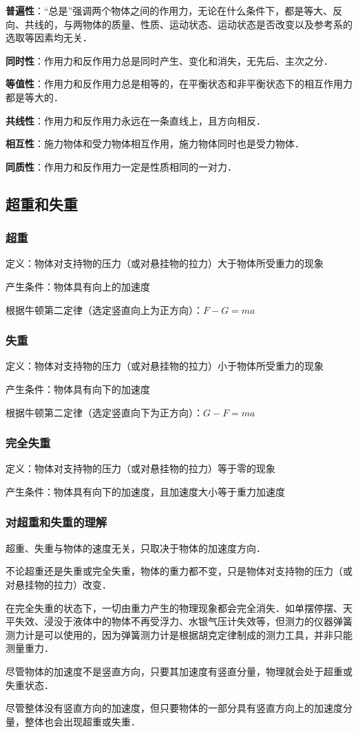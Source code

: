 \textbf{普遍性}：“总是”强调两个物体之间的作用力，无论在什么条件下，都是等大、反向、共线的，与两物体的质量、性质、运动状态、运动状态是否改变以及参考系的选取等因素均无关．

\textbf{同时性}：作用力和反作用力总是同时产生、变化和消失，无先后、主次之分．

\textbf{等值性}：作用力和反作用力总是相等的，在平衡状态和非平衡状态下的相互作用力都是等大的．

\textbf{共线性}：作用力和反作用力永远在一条直线上，且方向相反．

\textbf{相互性}：施力物体和受力物体相互作用，施力物体同时也是受力物体．

\textbf{同质性}：作用力和反作用力一定是性质相同的一对力．

\subsection{超重和失重}

\subsubsection{超重}

定义：物体对支持物的压力（或对悬挂物的拉力）大于物体所受重力的现象

产生条件：物体具有向上的加速度

根据牛顿第二定律（选定竖直向上为正方向）：$F-G=ma$

\subsubsection{失重}

定义：物体对支持物的压力（或对悬挂物的拉力）小于物体所受重力的现象

产生条件：物体具有向下的加速度

根据牛顿第二定律（选定竖直向下为正方向）：$G-F=ma$

\subsubsection{完全失重}

定义：物体对支持物的压力（或对悬挂物的拉力）等于零的现象

产生条件：物体具有向下的加速度，且加速度大小等于重力加速度

\subsubsection{对超重和失重的理解}

超重、失重与物体的速度无关，只取决于物体的加速度方向．

不论超重还是失重或完全失重，物体的重力都不变，只是物体对支持物的压力（或对悬挂物的拉力）改变．

在完全失重的状态下，一切由重力产生的物理现象都会完全消失．如单摆停摆、天平失效、浸没于液体中的物体不再受浮力、水银气压计失效等，但测力的仪器弹簧测力计是可以使用的，因为弹簧测力计是根据胡克定律制成的测力工具，并非只能测量重力．

尽管物体的加速度不是竖直方向，只要其加速度有竖直分量，物理就会处于超重或失重状态．

尽管整体没有竖直方向的加速度，但只要物体的一部分具有竖直方向上的加速度分量，整体也会出现超重或失重．
